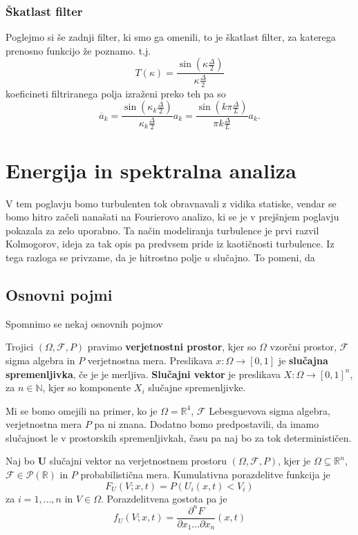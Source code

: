 \documentclass[mat2, tisk]{fmfdelo}
\newcommand{\R}{\mathbb R}
\newcommand{\N}{\mathbb N}
\newcommand{\bd}{\textbf}
\begin{document}
\subsubsection{Škatlast filter}
Poglejmo si še zadnji filter, ki smo ga omenili, to je 
škatlast filter, za katerega prenosno funkcijo že poznamo. t.j.
$$
T(\kappa) = \frac{\sin(\kappa \frac{\Delta}{2})}{\kappa \frac{\Delta}{2}}
$$
koeficineti filtriranega polja izraženi preko teh pa so 
$$
\overline{a}_k = \frac{\sin(\kappa_k \frac{\Delta}{2})}{\kappa_k \frac{\Delta}{2}} a_k = \frac{\sin(k\pi\frac{\Delta}{L})}{\pi k\frac{\Delta}{L}} a_k .
$$


\section{Energija in spektralna analiza}

V tem poglavju bomo turbulenten tok obravnavali z vidika statiske, 
vendar se bomo hitro začeli nanašati na Fourierovo analizo, ki 
se je v prejšnjem poglavju pokazala za zelo uporabno. Ta način 
modeliranja turbulence je prvi razvil Kolmogorov, ideja za tak 
opis pa predvsem pride iz kaotičnosti turbulence. Iz tega razloga se 
privzame, da je hitrostno polje $u$ slučajno. To pomeni, da 

\subsection{Osnovni pojmi}

Spomnimo se nekaj osnovnih pojmov

\begin{definicija}
Trojici $(\Omega, \mathcal{F}, P)$ pravimo \textbf{verjetnostni prostor}, 
kjer so $\Omega$ vzorčni prostor, $\mathcal{F}$ sigma algebra in 
$P$ verjetnostna mera. Preslikava $x: \Omega \rightarrow [0, 1]$ 
je \textbf{slučajna spremenljivka}, če je je merljiva. 
\textbf{Slučajni vektor} je preslikava $X: \Omega \rightarrow [0, 1]^n$, 
za $n\in \N$, kjer so komponente $X_i$ slučajne spremenljivke.
\end{definicija}

Mi se bomo omejili na primer, ko je $\Omega = \R^4$, $\mathcal{F}$ 
Lebesguevova sigma algebra, verjetnostna mera $P$ pa ni znana. 
Dodatno bomo predpostavili, da imamo slučajnost le v prostorskih 
spremenljivkah, času pa naj bo za tok determinističen. 

\begin{definicija}
Naj bo $\bd{U}$ slučajni vektor na verjetnostnem prostoru $(\Omega, \mathcal{F}, P)$,
kjer je $\Omega \subseteq \R^n$, $\mathcal{F} \in \mathcal{P}(\R)$ in $P$ probabilistična mera.
Kumulativna porazdelitve funkcija je
\begin{equation}
F_U(V; x, t) = P(U_i(x, t) < V_i)
\end{equation}
za $i = 1, \dots, n$ in $V \in \Omega$. Porazdelitvena 
gostota pa je 
\begin{equation}
f_U(V; x, t) = \frac{\partial^n F}{\partial x_1 \dots \partial x_n}(x, t)
\end{equation}
\end{definicija}
\end{document}
